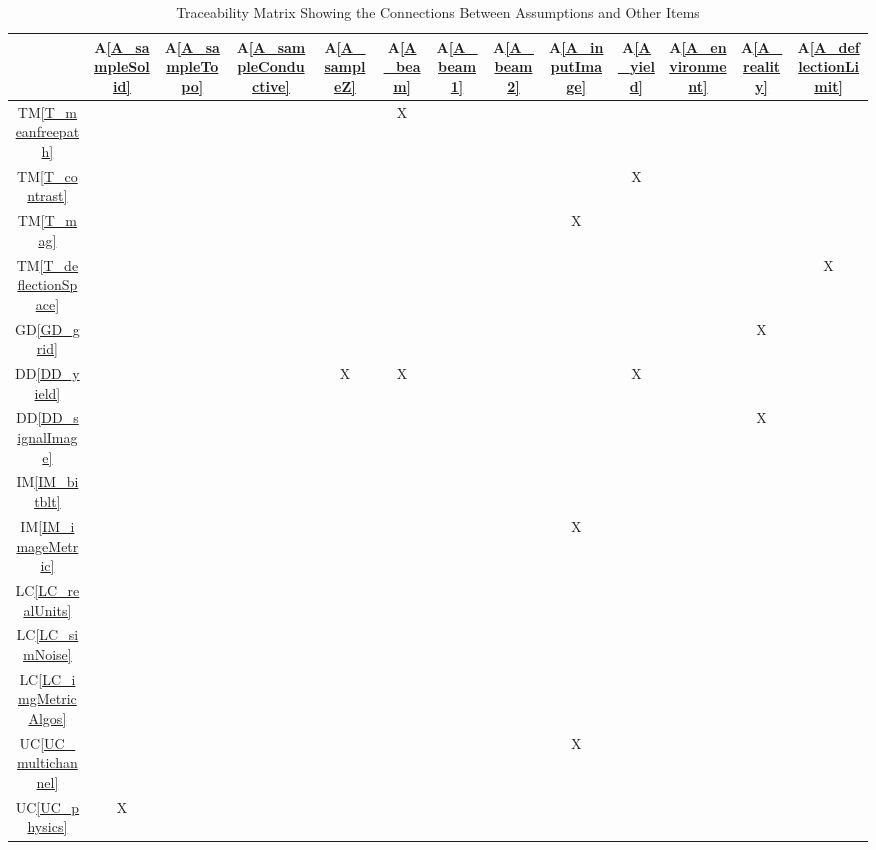 \documentclass[12pt]{article}
\newcommand{\dref}[1]{GD\ref{#1}}
\newcommand{\ddref}[1]{DD\ref{#1}}
\newcommand{\tref}[1]{TM\ref{#1}}
\newcommand{\aref}[1]{A\ref{#1}}
\newcommand{\iref}[1]{IM\ref{#1}}
\newcommand{\lcref}[1]{LC\ref{#1}}
\newcommand{\ucref}[1]{UC\ref{#1}}
\begin{document}
\begin{table}[h!]
\centering
\begin{tabular}{|c|c|c|c|c|c|c|c|c|c|c|c|c|}
\hline
	& \aref{A_sampleSolid}
	& \aref{A_sampleTopo}
	& \aref{A_sampleConductive}
	& \aref{A_sampleZ}
	& \aref{A_beam}
	& \aref{A_beam1}
	& \aref{A_beam2}
	& \aref{A_inputImage}
	& \aref{A_yield}
	& \aref{A_environment}
	& \aref{A_reality}
	& \aref{A_deflectionLimit}
\\ \hline
\tref{T_meanfreepath}      & & & & &X& & & & & & & \\ \hline
\tref{T_contrast}          & & & & & & & & &X& & & \\ \hline
\tref{T_mag}               & & & & & & & &X& & & & \\ \hline
\tref{T_deflectionSpace}   & & & & & & & & & & & &X\\ \hline
\dref{GD_grid}             & & & & & & & & & & &X& \\ \hline
\ddref{DD_yield}           & & & &X&X& & & &X& & & \\ \hline
\ddref{DD_signalImage}     & & & & & & & & & & &X& \\ \hline
\iref{IM_bitblt}           & & & & & & & & & & & & \\ \hline
\iref{IM_imageMetric}      & & & & & & & &X& & & & \\ \hline
\lcref{LC_realUnits}       & & & & & & & & & & & & \\ \hline
\lcref{LC_simNoise}        & & & & & & & & & & & & \\ \hline
\lcref{LC_imgMetricAlgos}  & & & & & & & & & & & & \\ \hline
\ucref{UC_multichannel}    & & & & & & & &X& & & & \\ \hline
\ucref{UC_physics}         &X& & & & & & & & & & & \\ \hline
\end{tabular}
\caption{Traceability Matrix Showing the Connections Between Assumptions and Other Items}
\label{Table:A_trace}
\end{table}
\end{document}
